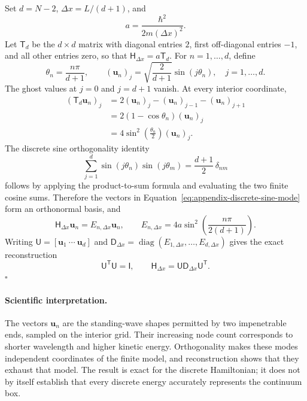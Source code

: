 \documentclass[11pt]{article}
\newcommand{\mat}[1]{\mathsf{#1}}
\newcommand{\vect}[1]{\boldsymbol{#1}}
\begin{document}
Set $d=N-2$, $\Delta x=L/(d+1)$, and
\begin{equation}
 a=\frac{\hbar^2}{2m(\Delta x)^2}.
\end{equation}
Let $\mat{T}_d$ be the $d\times d$ matrix with diagonal entries $2$, first
off-diagonal entries $-1$, and all other entries zero, so that
$\mat{H}_{\Delta x}=a\mat{T}_d$. For $n=1,\ldots,d$, define
\begin{equation}
 \theta_n=\frac{n\pi}{d+1},
 \qquad
 (\vect{u}_n)_j
 =\sqrt{\frac{2}{d+1}}\sin(j\theta_n),
 \quad j=1,\ldots,d.
 \label{eq:appendix-discrete-sine-mode}
\end{equation}
The ghost values at $j=0$ and $j=d+1$ vanish. At every interior coordinate,
\begin{align}
 (\mat{T}_d\vect{u}_n)_j
 &=2(\vect{u}_n)_j-(\vect{u}_n)_{j-1}-(\vect{u}_n)_{j+1} \\
 &=2(1-\cos\theta_n)(\vect{u}_n)_j \\
 &=4\sin^2\!\left(\frac{\theta_n}{2}\right)(\vect{u}_n)_j.
\end{align}
The discrete sine orthogonality identity
\begin{equation}
 \sum_{j=1}^{d}\sin(j\theta_n)\sin(j\theta_m)
 =\frac{d+1}{2}\,\delta_{nm}
 \label{eq:appendix-discrete-sine-orthogonality}
\end{equation}
follows by applying the product-to-sum formula and evaluating the two finite cosine
sums. Therefore the vectors in Equation~\eqref{eq:appendix-discrete-sine-mode} form an
orthonormal basis, and
\begin{equation}
 \mat{H}_{\Delta x}\vect{u}_n
 =E_{n,\Delta x}\vect{u}_n,
 \qquad
 E_{n,\Delta x}
 =4a\sin^2\!\left(\frac{n\pi}{2(d+1)}\right).
 \label{eq:appendix-discrete-eigenpair}
\end{equation}
Writing $\mat{U}=[\vect{u}_1\ \cdots\ \vect{u}_d]$ and
$\mat{D}_{\Delta x}=\operatorname{diag}(E_{1,\Delta x},\ldots,E_{d,\Delta x})$
gives the exact reconstruction
\begin{equation}
 \mat{U}^{\mathsf T}\mat{U}=\mat{I},
 \qquad
 \mat{H}_{\Delta x}
 =\mat{U}\mat{D}_{\Delta x}\mat{U}^{\mathsf T}.
 \label{eq:appendix-exact-reconstruction}
\end{equation}
\hfill$\square$

\paragraph{Scientific interpretation.}
The vectors $\vect{u}_n$ are the standing-wave shapes permitted by two impenetrable
ends, sampled on the interior grid. Their increasing node count corresponds to
shorter wavelength and higher kinetic energy. Orthogonality makes these modes
independent coordinates of the finite model, and reconstruction shows that they
exhaust that model. The result is exact for the discrete Hamiltonian; it does not by
itself establish that every discrete energy accurately represents the continuum box.
\end{document}
